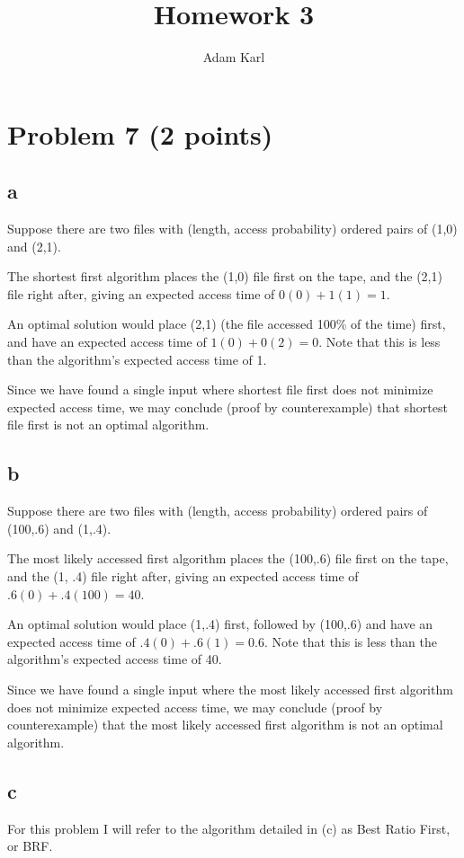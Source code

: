 \documentclass[a4paper]{article}
\title{Homework 3}
\author{Adam Karl}
\begin{document}
\maketitle


\section{Problem 7 (2 points)}
\subsection{a}

Suppose there are two files with (length, access probability) ordered pairs of (1,0) and (2,1). 

The shortest first algorithm places the (1,0) file first on the tape, and the (2,1) file right after, giving an expected access time of $0(0) + 1(1) = 1$.

An optimal solution would place (2,1) (the file accessed 100\% of the time) first, and have an expected access time of $1(0) + 0(2) = 0$. Note that this is less than the algorithm's expected access time of 1.

Since we have found a single input where shortest file first does not minimize expected access time, we may conclude (proof by counterexample) that shortest file first is not an optimal algorithm.


\subsection{b}

Suppose there are two files with (length, access probability) ordered pairs of (100,.6) and (1,.4).

The most likely accessed first algorithm places the (100,.6) file first on the tape, and the (1,
.4) file right after, giving an expected access time of $.6(0) + .4(100) = 40$.

An optimal solution would place (1,.4) first, followed by (100,.6) and have an expected access time of $.4(0) + .6(1) = 0.6$. Note that this is less than the algorithm's expected access time of 40.

Since we have found a single input where the most likely accessed first algorithm does not minimize expected access time, we may conclude (proof by counterexample) that the most likely accessed first algorithm is not an optimal algorithm.

\subsection{c}
For this problem I will refer to the algorithm detailed in (c) as Best Ratio First, or BRF.
\end{document}
